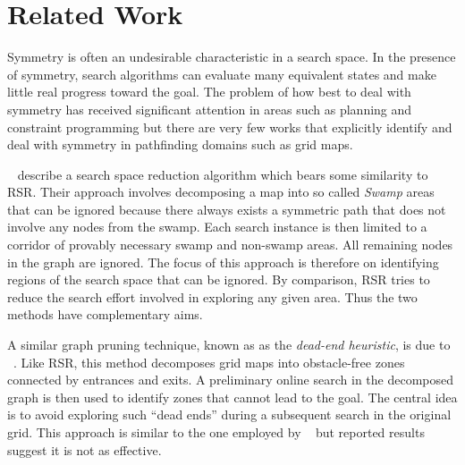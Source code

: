 \section{Related Work}
\label{sec:relatedwork}
Symmetry is often an undesirable characteristic in a search space.
In the presence of symmetry, search algorithms can evaluate many equivalent
states and make little real progress toward the goal.
The problem of how best to deal with symmetry has received significant attention 
in areas such as planning \cite{fox99} and constraint programming \cite{gent00} 
but there are very few works that explicitly identify and deal with symmetry in 
pathfinding domains such as grid maps. 
\par
\citeauthor{pochter10}~ describe a search space reduction
algorithm which bears some similarity to RSR.  Their approach involves
decomposing a map into so called \emph{Swamp} areas that can be ignored because
there always exists a symmetric path that does not involve any nodes from the swamp.
Each search instance is then limited to a corridor of provably necessary swamp
and non-swamp areas. All remaining nodes in the graph are ignored. 
The focus of this approach is therefore on 
identifying regions of the search space that can be ignored.  By comparison, RSR
tries to reduce the search effort involved in exploring any given area. Thus the
two methods have complementary aims.
\par
A similar graph pruning technique, known as as the \emph{dead-end heuristic},
is due to \citeauthor{bjornsson06}~.  Like RSR, this method
decomposes grid maps into obstacle-free zones connected by entrances and exits.
A preliminary online search in the decomposed graph is then used to identify
zones that cannot lead to the goal.  The central idea is to avoid exploring such
``dead ends'' during a subsequent search in the original grid.  This approach is
similar to the one employed by \citeauthor{pochter10}~ but
reported results suggest it is not as effective.

